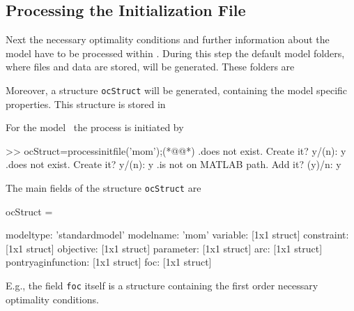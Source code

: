 \subsection{Processing the Initialization File}
\label{sec:ProcessingInitializationFile}
Next the necessary optimality conditions and further information about the model have to be processed within \OCMAT. During this step the default model folders, where files and data are stored, will be generated. These folders are
\begin{pathlisting}
ocmat\model\usermodel\[modelname]
ocmat\model\usermodel\[modelname]\data
\end{pathlisting}
Moreover, a structure \lstinline+ocStruct+ will be generated, containing the model specific properties. This structure is stored in
\begin{pathlisting}
ocmat\model\usermodel\[modelname]\data\[modelname]ModelDataStructure.mat
\end{pathlisting}
For the model \MoM\ the process is initiated by
\begin{matlab}
>> ocStruct=processinitfile('mom');(*@@*)
.\ocmat\model\usermodel\mom does not exist. Create it?  y/(n): y
.\ocmat\model\usermodel\mom\data does not exist. Create it?  y/(n): y
.\ocmat\model\usermodel\mom\data is not on MATLAB path. Add it?  (y)/n: y
\end{matlab}
The main fields of the structure \lstinline+ocStruct+ are
\begin{matlab}
ocStruct = 

             modeltype: 'standardmodel'
             modelname: 'mom'
              variable: [1x1 struct]
            constraint: [1x1 struct]
             objective: [1x1 struct]
             parameter: [1x1 struct]
                   arc: [1x1 struct]
    pontryaginfunction: [1x1 struct]
                   foc: [1x1 struct]
\end{matlab}
E.g., the field \lstinline+foc+ itself is a structure containing the first order necessary optimality conditions. %

